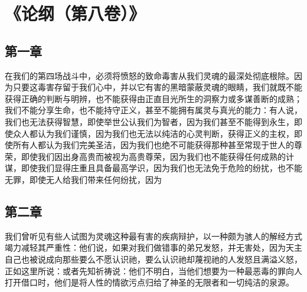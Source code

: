 
\section{《论纲（第八卷）》}


\subsection{第一章}

\par

在我们的第四场战斗中，必须将愤怒的致命毒害从我们灵魂的最深处彻底根除。因为只要这毒害存留于我们心中，并以它有害的黑暗蒙蔽灵魂的眼睛，我们就既不能获得正确的判断与明辨，也不能获得由正直目光所生的洞察力或多谋善断的成熟；我们不能分享生命，也不能持守正义，甚至不能拥有属灵与真光的能力：有人说，我们也无法获得智慧，即使举世公认我们为智者，因为我们甚至不能得到永生，即使众人都认为我们谨慎，因为我们也无法以纯洁的心灵判断，获得正义的主权，即使所有人都认为我们完美圣洁，因为我们也绝不可能获得那种甚至常现于世人的尊荣，即使我们因出身高贵而被视为高贵尊荣，因为我们也不能获得任何成熟的计谋，即使我们显得庄重且具备最高学识，因为我们也无法免于危险的纷扰，也不能无罪，即使无人给我们带来任何纷扰，因为\par


\subsection{第二章}

\par

我们曾听见有些人试图为灵魂这种最有害的疾病辩护，以一种颇为骇人的解经方式竭力减轻其严重性：他们说，如果对我们做错事的弟兄发怒，并无害处，因为天主自己也被说成向那些要么不愿认识祂，要么认识祂却蔑视祂的人发怒且满溢义怒，正如这里所说：或者先知祈祷说：他们不明白，当他们想要为一种最恶毒的罪向人打开借口时，他们是将人性的情欲污点归给了神圣的无限者和一切纯洁的泉源。\par

